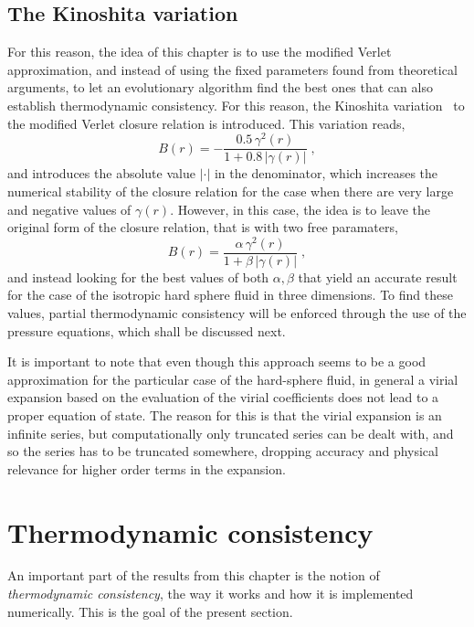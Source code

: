 \subsection{The Kinoshita variation}
For this reason, the idea of this chapter is to use the modified Verlet approximation, and instead of using the fixed parameters found from theoretical arguments, to let an evolutionary algorithm find the best ones that can also establish thermodynamic consistency. For this reason, the Kinoshita variation~\cite{kinoshitaInteractionSurfacesSolvophobicity2003} to the modified Verlet closure relation is introduced. This variation reads,
\begin{equation}
    B(r) = - \frac{0.5 \, \gamma^{2}(r)}{1 + 0.8 \, \left\lvert \gamma(r) \right\rvert}
    \; ,
    \label{eq:kinoshita-eq}
\end{equation}
and introduces the absolute value \(\left\lvert \cdot \right\rvert\) in the denominator, 
which increases the numerical stability of the closure relation for the case when there are 
very large and negative values of \(\gamma(r)\). However, in this case, the idea is to leave the original form of the closure relation, that is with two free paramaters,
\begin{equation}
    B(r) = \frac{\alpha \, \gamma^{2}(r)}{1 + \beta \, \left\lvert \gamma(r) \right\rvert}
    \; ,
    \label{eq:kinoshita-params}
\end{equation}
and instead looking for the best values of both \(\alpha, \beta\) that yield an accurate 
result for the case of the isotropic hard sphere fluid in three dimensions.
To find these values, partial thermodynamic consistency will be enforced through the use of 
the pressure equations, which shall be discussed next.

It is important to note that even though this approach seems to be a good approximation for
the particular case of the hard-sphere fluid, in general a virial expansion based on the
evaluation of the virial coefficients does not lead to a proper equation of state. The 
reason for this is that the virial expansion is an infinite series, but computationally 
only truncated series can be dealt with, and so the series has to be truncated somewhere, 
dropping accuracy and physical relevance for higher order terms in the expansion.

\section{Thermodynamic consistency}
An important part of the results from this chapter is the notion of 
\emph{thermodynamic consistency}, the way it works and how it is implemented numerically. 
This is the goal of the present section.

